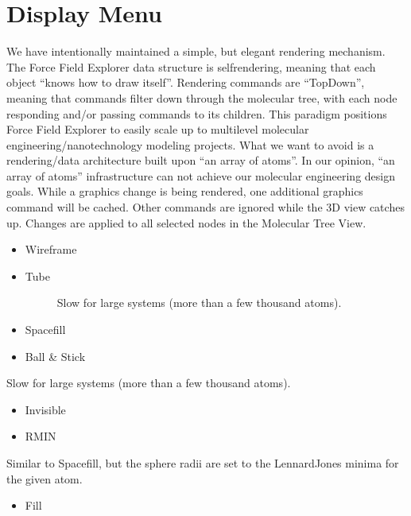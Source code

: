 \documentclass[letterpaper,11pt,english]{sphinxmanual}
\begin{document}
\section{Display Menu}
\label{\detokenize{text/menus:display-menu}}
We have intentionally maintained a simple, but elegant rendering mechanism. The Force Field Explorer data structure is self\sphinxhyphen{}rendering, meaning that each object “knows how to draw itself”. Rendering commands are “Top\sphinxhyphen{}Down”, meaning that commands filter down through the molecular tree, with each node responding and/or passing commands to its children. This paradigm positions Force Field Explorer to easily scale up to multi\sphinxhyphen{}level molecular engineering/nanotechnology modeling projects. What we want to avoid is a rendering/data architecture built upon “an array of atoms”. In our opinion, “an array of atoms” infrastructure can not achieve our molecular engineering design goals. While a graphics change is being rendered, one additional graphics command will be cached. Other commands are ignored while the 3D view catches up. Changes are applied to all selected nodes in the Molecular Tree View.
\begin{itemize}
\item {} 
Wireframe

\item {} \begin{description}
\item[{Tube}] \leavevmode
Slow for large systems (more than a few thousand atoms).

\end{description}

\item {} 
Spacefill

\item {} 
Ball \& Stick

\end{itemize}

Slow for large systems (more than a few thousand atoms).
\begin{itemize}
\item {} 
Invisible

\item {} 
RMIN

\end{itemize}

Similar to Spacefill, but the sphere radii are set to the Lennard\sphinxhyphen{}Jones minima for the given atom.
\begin{itemize}
\item {} 
Fill

\end{itemize}
\end{document}
